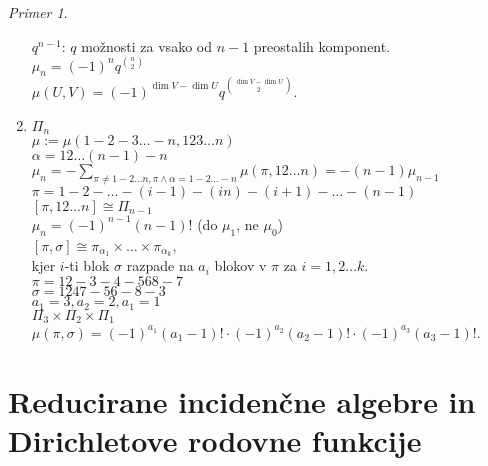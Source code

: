 \documentclass[a4paper, 12pt]{book}
\theoremstyle{definition}
\theoremstyle{remark}
\newtheorem*{ex}{Primer}
\begin{document}
\begin{ex}
\begin{enumerate}[label=(\alph*)]
      $q^{n-1}$: $q$ možnosti za vsako od $n-1$ preostalih komponent. \\
      $\mu_n = (-1)^n q^{\binom{n}{2}}$ \\
      $\mu(U, V) = (-1)^{\dim V - \dim U} q^{\binom{\dim V - \dim U}{2}}$.
    \item $\Pi_n$ \\
      $\mu := \mu(1-2-3 \dots -n, 123 \dots n)$ \\
      $\alpha = 1 2 \dots (n-1)-n$ \\
      $\mu_n = -\sum_{\pi \neq 1-2 \dots n, \pi \land \alpha = 1-2 \dots -n} \mu(\pi, 12 \dots n) = -(n-1) \mu_{n-1}$ \\
      $\pi = 1-2- \dots -(i-1)-(in)-(i+1)- \dots -(n-1)$ \\
      $[\pi, 12 \dots n] \cong \Pi_{n-1}$ \\
      $\mu_n = (-1)^{n-1} (n-1)!$ (do $\mu_1$, ne $\mu_0$) \\
      $[\pi, \sigma] \cong \pi_{\alpha_1} \times \dots \times \pi_{\alpha_k}$, \\
      kjer $i$-ti blok $\sigma$ razpade na $a_i$ blokov v $\pi$ za $i = 1, 2 \dots k$. \\
      $\pi = 12-3-4-568-7$ \\
      $\sigma = 1247-56-8-3$ \\
      $a_1 = 3, a_2 = 2, a_1 = 1$ \\
      $\Pi_3 \times \Pi_2 \times \Pi_1$ \\
      $\mu(\pi, \sigma) = (-1)^{a_1} (a_1 - 1)! \cdot (-1)^{a_2} (a_2 - 1)! \cdot (-1)^{a_3} (a_3 - 1)!$.
  \end{enumerate}
\end{ex}


\section{Reducirane incidenčne algebre in Dirichletove rodovne funkcije}
\end{document}
